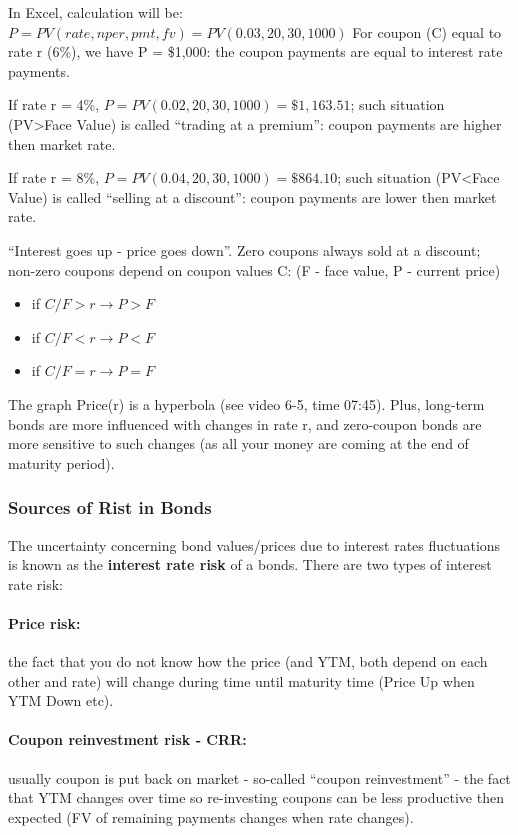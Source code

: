\documentclass{scrartcl}
\begin{document}
In Excel, calculation will be: $P=PV(rate, nper, pmt, fv)= PV(0.03, 20, 30,
1000)$ For coupon (C) equal to rate r (6\%), we have P = \$1,000: the coupon
payments are equal to interest rate payments.

If rate r = 4\%, $P= PV(0.02, 20, 30, 1000)=\$1,163.51$; such situation (PV>Face
Value) is called ``trading at a premium'': coupon payments are higher then
market rate.

If rate r = 8\%, $P= PV(0.04, 20, 30, 1000)=\$864.10$; such situation (PV<Face
Value) is called ``selling at a discount'': coupon payments are lower then
market rate.

``Interest goes up - price goes down''. Zero coupons always sold at a discount;
non-zero coupons depend on coupon values C: (F - face value, P - current price)
\begin{itemize}
\item if $C/F > r \to P > F$
\item if $C/F < r \to P < F$
\item if $C/F = r \to P = F$
\end{itemize}

The graph Price(r) is a hyperbola (see video 6-5, time 07:45). Plus, long-term
bonds are more influenced with changes in rate r, and zero-coupon bonds are more
sensitive to such changes (as all your money are coming at the end of maturity
period).

\subsubsection{Sources of Rist in Bonds}
\label{sec:SourcesOfRiskBonds}

The uncertainty concerning bond values/prices due to interest rates fluctuations
is known as the {\bf interest rate risk} of a bonds. There are two types of
interest rate risk:
\paragraph{Price risk:} the fact that you do not know how the price (and YTM,
both depend on each other and rate) will change during time until maturity time
(Price Up when YTM Down etc).

\paragraph{Coupon reinvestment risk - CRR:} 
usually coupon is put back on market - so-called ``coupon reinvestment'' - the
fact that YTM changes over time so re-investing coupons can be less productive
then expected (FV of remaining payments changes when rate changes).
\end{document}
